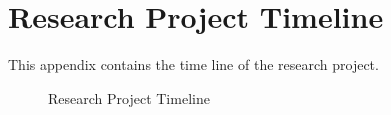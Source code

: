 %
%
%                 

\chapter{Research Project Timeline}
\label{sec:appendixd}

This appendix contains the time line of the research project.

\begin{figure}[h]
	\centering
	\captionsetup{justification=centering}
	\caption{Research Project Timeline}
	\label{fig:calendar}
\end{figure}


